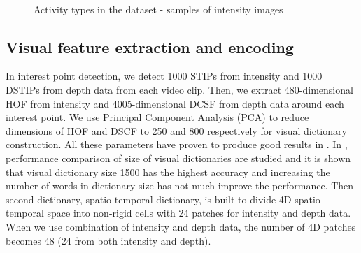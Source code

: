\begin{figure}[!htbp]
\hfill
{}\hfill
{}\\

\caption{Activity types in the dataset - samples of intensity images}
\label{fig:DatasetActivities}
\end{figure}
    
    	\subsection{Visual feature extraction and encoding}
        \label{section:VisualFeatureExtractionAndEncoding}
        In interest point detection, we detect 1000 STIPs from intensity and 1000 DSTIPs from depth data from each video clip. Then, we extract 480-dimensional HOF from intensity and 4005-dimensional DCSF from depth data around each interest point. We use Principal Component Analysis (PCA) to reduce dimensions of HOF and DSCF to 250 and 800 respectively for visual dictionary construction. All these parameters have proven to produce good results in \citet{twinanda2015data}. In \cite{twinanda2015data}, performance comparison of size of visual dictionaries are studied and it is shown that visual dictionary size 1500 has the highest accuracy and increasing the number of words in dictionary size has not much improve the performance. Then second dictionary, spatio-temporal dictionary, is built to divide 4D spatio-temporal space into non-rigid cells with 24 patches for intensity and depth data. When we use combination of intensity and depth data, the number of 4D patches becomes 48 (24 from both intensity and depth).

